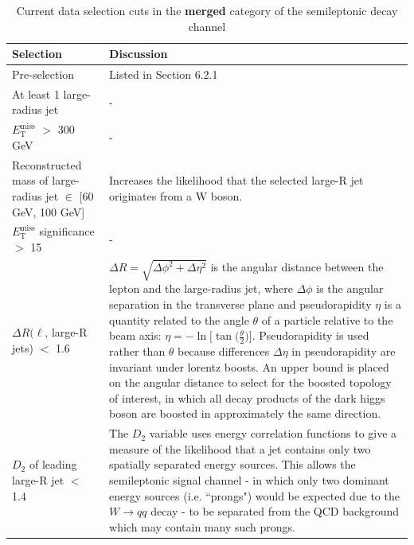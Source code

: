 \documentclass[12pt]{article}
\newcommand*{\met}{\ensuremath{E_\text{T}^\text{miss}} }
\begin{document}
\begin{table}[H]
\centering
\caption{Current data selection cuts in the \textbf{merged} category of the semileptonic decay channel}
\label{tab:merged_cuts}
\begin{footnotesize}
\renewcommand{\arraystretch}{1.5}
\begin{tabular}{|p{50mm}|p{100mm}|}
\hline
\textbf{Selection} & \textbf{Discussion}  \\ \hline
Pre-selection & Listed in Section 6.2.1      \\ \hline
At least 1 large-radius jet & -      \\ \hline
\met $>$ 300 GeV      & -      \\ \hline
Reconstructed mass of large-radius jet $\in$ [60 GeV, 100 GeV]     & Increases the likelihood that the selected large-R jet originates from a W boson.        \\ \hline
\met significance $>$ 15    &  -        \\ \hline
$\Delta R(\ell$, large-R jets) $<$ 1.6    & $\Delta R = \sqrt{\Delta\phi^2+\Delta\eta^2}$ is the angular distance between the lepton and the large-radius jet, where $\Delta\phi$ is the angular separation in the transverse plane and pseudorapidity $\eta$ is a quantity related to the angle $\theta$ of a particle relative to the beam axis: $\eta=-\ln\Big[\tan\Big(\frac{\theta}{2}\Big)\Big]$. Pseudorapidity is used rather than $\theta$ because differences $\Delta\eta$ in pseudorapidity are invariant under lorentz boosts. An upper bound is placed on the angular distance to select for the boosted topology of interest, in which all decay products of the dark higgs boson are boosted in approximately the same direction.      \\ \hline
$D_{2}$ of leading large-R jet $<$ 1.4   & The $D_{2}$ variable \cite{Marzani_2019} uses energy correlation functions to give a measure of the likelihood that a jet contains only two spatially separated energy sources. This allows the semileptonic signal channel - in which only two dominant energy sources (i.e. ``prongs") would be expected due to the $W\rightarrow qq$ decay - to be separated from the QCD background which may contain many such prongs.     \\ \hline
\end{tabular}
\end{footnotesize}
\end{table}
\end{document}
